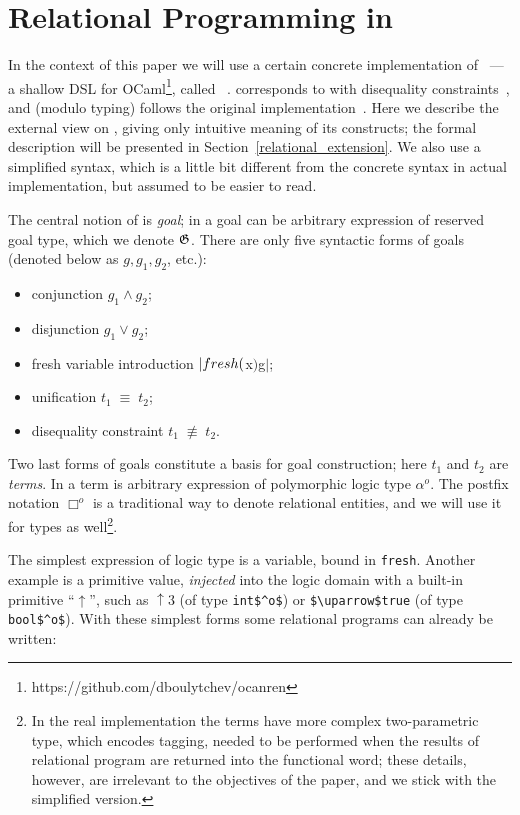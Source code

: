 \section{Relational Programming in \miniKanren}
\label{ocanren}

In the context of this paper we will use a certain concrete implementation of \miniKanren~--- a shallow DSL for 
OCaml\footnote{https://github.com/dboulytchev/ocanren}, called \ocanren~\cite{ocanren}. \ocanren corresponds to \miniKanren with
disequality constraints~\cite{CKanren}, and (modulo typing) follows the original implementation~\cite{MicroKanren}. Here we describe the external view 
on \ocanren, giving only intuitive meaning of its constructs; the formal description will be presented in Section~\ref{relational_extension}.
We also use a simplified syntax, which is a little bit different from the concrete syntax in actual implementation, but assumed to
be easier to read.

The central notion of \miniKanren is \emph{goal}; in \ocanren a goal can be arbitrary expression of reserved goal type, which we denote $\mathfrak G$.
There are only five syntactic forms of goals (denoted below as $g, g_1, g_2$, etc.):

\begin{itemize}
  \item conjunction $g_1\wedge g_2$;
  \item disjunction $g_1\vee g_2$;
  \item fresh variable introduction $\lstinline|fresh ($x$) $\;g$|$;
  \item unification $t_1\;\equiv\;t_2$;
  \item disequality constraint $t_1\;\not\equiv\;t_2$.
\end{itemize}

Two last forms of goals constitute a basis for goal construction; here $t_1$ and $t_2$ are \emph{terms}. In \ocanren a term is arbitrary expression of polymorphic logic type $\alpha^o$. The postfix notation $\Box^o$ is a traditional way to denote relational entities, and we will use it for types as well\footnote{In the real implementation the terms have more complex two-parametric type, which encodes tagging, needed to be performed when the results of relational program are returned into the functional word; these details, however, are irrelevant to the objectives of the paper, and we stick with the simplified version.}.

The simplest expression of logic type is a variable, bound in \lstinline|fresh|. Another example is a primitive value, \emph{injected} into the logic domain with a built-in primitive ``$\uparrow$'', such as $\uparrow\!3$ (of type \lstinline|int$^o$|) or \lstinline|$\uparrow$true| (of type \lstinline|bool$^o$|). With these simplest forms some relational programs can already be written:

